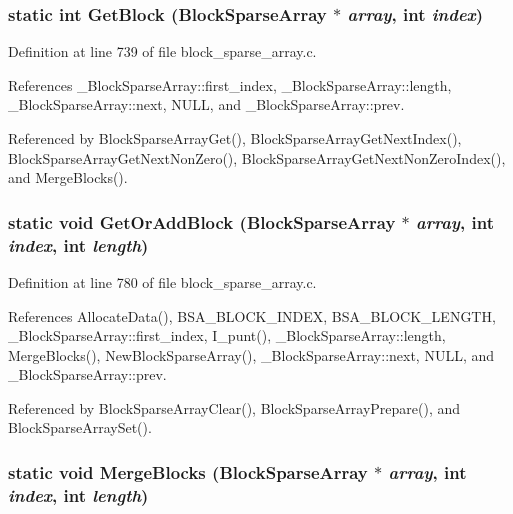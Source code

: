 \subsubsection{\setlength{\rightskip}{0pt plus 5cm}static int Get\-Block (\bf{Block\-Sparse\-Array} $\ast$ {\em array}, int {\em index})\hspace{0.3cm}{\tt  [static]}}\label{block__sparse__array_8c_5994e103574776b45fc60c6a2806fa16}




Definition at line 739 of file block\_\-sparse\_\-array.c.

References \_\-Block\-Sparse\-Array::first\_\-index, \_\-Block\-Sparse\-Array::length, \_\-Block\-Sparse\-Array::next, NULL, and \_\-Block\-Sparse\-Array::prev.

Referenced by Block\-Sparse\-Array\-Get(), Block\-Sparse\-Array\-Get\-Next\-Index(), Block\-Sparse\-Array\-Get\-Next\-Non\-Zero(), Block\-Sparse\-Array\-Get\-Next\-Non\-Zero\-Index(), and Merge\-Blocks().
\subsubsection{\setlength{\rightskip}{0pt plus 5cm}static void Get\-Or\-Add\-Block (\bf{Block\-Sparse\-Array} $\ast$ {\em array}, int {\em index}, int {\em length})\hspace{0.3cm}{\tt  [static]}}\label{block__sparse__array_8c_dd79f6f9fc689b08c9348092df9fcd82}




Definition at line 780 of file block\_\-sparse\_\-array.c.

References Allocate\-Data(), BSA\_\-BLOCK\_\-INDEX, BSA\_\-BLOCK\_\-LENGTH, \_\-Block\-Sparse\-Array::first\_\-index, I\_\-punt(), \_\-Block\-Sparse\-Array::length, Merge\-Blocks(), New\-Block\-Sparse\-Array(), \_\-Block\-Sparse\-Array::next, NULL, and \_\-Block\-Sparse\-Array::prev.

Referenced by Block\-Sparse\-Array\-Clear(), Block\-Sparse\-Array\-Prepare(), and Block\-Sparse\-Array\-Set().
\subsubsection{\setlength{\rightskip}{0pt plus 5cm}static void Merge\-Blocks (\bf{Block\-Sparse\-Array} $\ast$ {\em array}, int {\em index}, int {\em length})\hspace{0.3cm}{\tt  [static]}}\label{block__sparse__array_8c_7566e8b8b809ba4a0abcafa6ad6d3e06}




